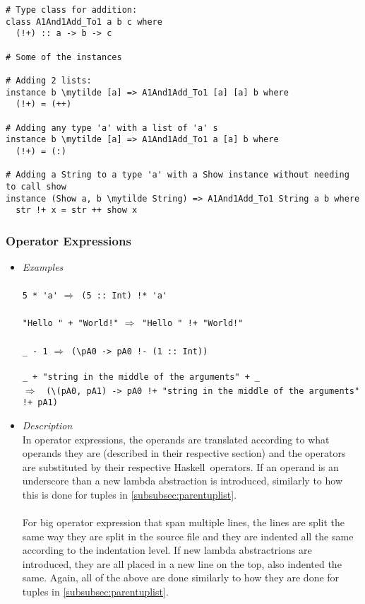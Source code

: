 \documentclass{article}
\def\H{Haskell}
\def\lra{$\Longrightarrow$\ }
\newcommand{\mytilde}{$\sim$}
\begin{document}
\newpage
\begin{Verbatim}[commandchars=\\\{\}]
# Type class for addition:
class A1And1Add_To1 a b c where
  (!+) :: a -> b -> c

# Some of the instances

# Adding 2 lists:
instance b \mytilde [a] => A1And1Add_To1 [a] [a] b where
  (!+) = (++)

# Adding any type 'a' with a list of 'a' s
instance b \mytilde [a] => A1And1Add_To1 a [a] b where
  (!+) = (:)

# Adding a String to a type 'a' with a Show instance without needing to call show
instance (Show a, b \mytilde String) => A1And1Add_To1 String a b where
  str !+ x = str ++ show x

\end{Verbatim}

\subsubsection{Operator Expressions}

\begin{itemize}
\item
\textit{Examples}\\\\
\verb|5 * 'a'| \lra \verb|(5 :: Int) !* 'a'|
\\\\
\verb|"Hello " + "World!"| \lra \verb|"Hello " !+ "World!"|
\\\\
\verb|_ - 1| \lra \verb|(\pA0 -> pA0 !- (1 :: Int))|
\\\\
\verb|_ + "string in the middle of the arguments" + _|
\\\lra
\verb|(\(pA0, pA1) -> pA0 !+ "string in the middle of the arguments" !+ pA1)|
\\

\item
\textit{Description}\\

In operator expressions, the operands are translated according to what operands
they are (described in their respective section) and the operators are
substituted by their respective \H\ operators. If an operand is an underscore
than a new lambda abstraction is introduced, similarly to how this is done for
tuples in \ref{subsubsec:parentuplist}.
\\\\
For big operator expression that span multiple lines, the lines are split the
same way they are split in the source file and they are indented all the same
according to the indentation level. If new lambda abstractrions are introduced,
they are all placed in a new line on the top, also indented the same. Again,
all of the above are done similarly to how they are done for tuples in
\ref{subsubsec:parentuplist}.

\end{itemize}
\end{document}
